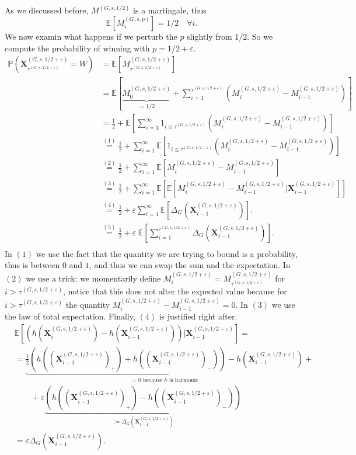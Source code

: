 \documentclass{article}
\newcommand{\win}{W}
\newcommand{\x}{\mathbf{X}}
\newcommand{\xge}{\x^{\left(G, s, 1/2 + \varepsilon\right)}}
\newcommand{\tauge}{{\tau^{\left(G, s, 1/2 + \varepsilon\right)}}}
\newcommand{\mge}{\m^{\left(G, s, 1/2 + \varepsilon\right)}}
\newcommand{\mgp}{\m^{\left(G, s, p\right)}}
\newcommand{\m}{M}
\newcommand{\ex}{\mathbb{E}}
\newcommand{\pr}{\mathbb{P}}
\newcommand{\h}{h}
\begin{document}
As we discussed before, $\m^{(G, s, 1/2)}$ is a martingale, thus 
$$
\ex\left[\mgp_i\right] = 1/2 \quad \forall i.
$$
We now examin what happens if we perturb the $p$ slightly from $1/2$. So we compute the probability of winning with $p = 1/2 + \varepsilon$.
\begin{align*}
    \pr\left(\xge_\tauge = \win\right) &= \ex\left[\mge_\tauge\right]\\
    &= \ex\left[\underbrace{\mge_0}_{=1/2} + \sum_{i=1}^{\tauge} \left(\mge_i - \mge_{i-1}\right)\right] \\
    &= \frac12 + \ex\left[\sum_{i=1}^{\infty} 1_{i \leq \tauge}\left(\mge_i - \mge_{i-1}\right)\right]\\
    &\overset{(1)}{=} \frac12 +\sum_{i=1}^{\infty} \ex\left[1_{i \leq \tauge}\left(\mge_i - \mge_{i-1}\right)\right]\\
    &\overset{(2)}{=} \frac12 +\sum_{i=1}^{\infty} \ex\left[\mge_i - \mge_{i-1}\right]\\
    &\overset{(3)}{=} \frac12 +\sum_{i=1}^{\infty} \ex\left[\ex\left[\mge_i - \mge_{i-1}\vert \xge_{i-1}\right]\right]\\
    &\overset{(4)}{=} \frac12 +\varepsilon \sum_{i=1}^{\infty} \ex\left[\Delta_G\left(\xge_{i-1}\right)\right].\\
    &\overset{(5)}{=} \frac12 +\varepsilon \; \ex\left[\sum_{i=1}^{\tauge} \Delta_G\left(\xge_{i-1}\right)\right].\\
\end{align*}
In $(1)$ we use the fact that the quantity we are trying to bound is a probability, thus is between $0$ and $1$, and thus we can swap the sum and the expectation.
In $(2)$ we use a trick: we momentarily define $\mge_i = \mge_{\tauge}$ for $i > \tauge$, notice that this does not alter the expected value because for $i > \tauge$ the quantity $\mge_i - \mge_{i-1}=0$. In $(3)$ we use the law of total expectation. Finally, $(4)$ is justified right after.
\begin{align*}
& \ex\left[\left(\h\left(\xge_i\right) - \h\left(\xge_{i-1}\right)\right)\vert \xge_{i-1}\right] = \\
&= \underbrace{\frac12\left(\h\left(\left(\xge_{i-1}\right)_+\right) + \h\left(\left(\xge_{i-1}\right)_-\right)\right) - \h\left(\xge_{i-1}\right)}_{= 0 \text{ because } \h \text{ is harmonic}} + \\
& \quad\quad + \varepsilon \underbrace{\left(\h\left(\left(\xge_{i-1}\right)_+\right) - \h\left(\left(\xge_{i-1}\right)_-\right)\right)}_{:= \Delta_G\left(\xge_{i-1}\right)} \\
&= \varepsilon \Delta_G\left(\xge_{i-1}\right).
\end{align*}
\end{document}
